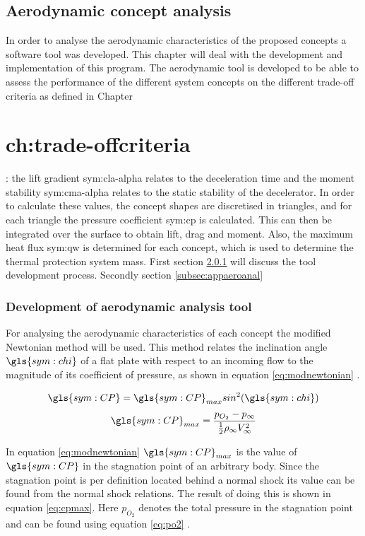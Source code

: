 \section{Aerodynamic concept analysis}
\label{ch:aero_analysis}
In order to analyse the aerodynamic characteristics of the proposed concepts a software tool was developed. This chapter will deal with the development and implementation of this program. The aerodynamic tool is 
developed to be able to assess the performance of the different system concepts on the different trade-off criteria as defined in Chapter \chapter{ch:trade-offcriteria}: the lift gradient \gls{sym:cla-alpha} relates to the deceleration time and the moment stability \gls{sym:cma-alpha} relates to the static stability of the decelerator. In order to calculate these values, the concept shapes are discretised in triangles, and for each triangle the pressure coefficient \gls{sym:cp} is calculated. This can then be integrated over the surface to obtain lift, drag and moment. Also, the maximum heat flux \gls{sym:qw} is determined for each concept, which is used to determine the thermal protection system mass. First section \ref{subsec:aerotool} will discuss the tool development process. Secondly section \ref{subsec:appaeroanal} 

\subsection{Development of aerodynamic analysis tool}
\label{subsec:aerotool}
For analysing the aerodynamic characteristics of each concept the modified Newtonian method will be used. This method relates the inclination angle $\gls{sym:chi}$ of a flat plate with respect to an incoming flow to the magnitude of its coefficient of pressure, as shown in equation \ref{eq:modnewtonian} \cite{AndersonJr.2006}.
\begin{multicols}{2}
\begin{equation}
\gls{sym:CP}=\gls{sym:CP}_{max}sin^{2}(\gls{sym:chi})
\label{eq:modnewtonian}
\end{equation} \break
\begin{equation}
\gls{sym:CP}_{max}=\frac{p_{O_{2}}-p_{\infty}}{\frac{1}{2}\rho_{\infty}V_{\infty}^{2}}
\label{eq:cpmax}
\end{equation}
\end{multicols}
In equation \ref{eq:modnewtonian} $\gls{sym:CP}_{max}$ is the value of $\gls{sym:CP}$ in the stagnation point of an arbitrary body. Since the stagnation point is per definition located behind a normal shock its value can be found from the normal shock relations. The result of doing this is shown in equation \ref{eq:cpmax}. Here $p_{O_{2}}$ denotes the total pressure in the stagnation point and can be found using equation \ref{eq:po2} \cite{AndersonJr.2007}.

